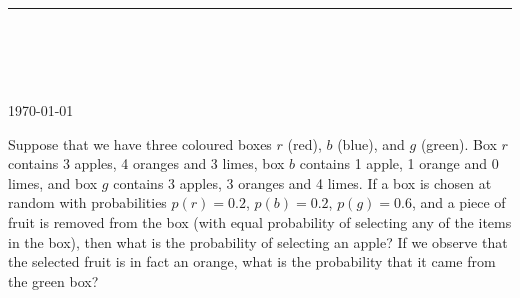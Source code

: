 



\thispagestyle{empty}

\begin{center}
\textsc{\theinstitution}\\[2mm]

\thedepartment

\rule{0.6\textwidth}{0.5pt}\\[2mm]

\thecourse \\[4mm]

{\Large \textbf{\thetitle}}\\[2mm]

\theauthor \\[2mm]

{\small \today}
\end{center}
\medskip

\vspace{1cm}

Suppose that we have three coloured boxes $r$ (red), $b$ (blue), and $g$ (green). Box $r$ contains 3 apples, 4 oranges and 3 limes, box $b$ contains 1 apple, 1 orange and 0 limes, and box $g$ contains 3 apples, 3 oranges and 4 limes. If a box is chosen at random with probabilities $p(r)=0.2$, $p(b)=0.2$, $p(g)=0.6$, and a piece of fruit is removed from the box (with equal probability of selecting any of the items in the box), then what is the probability of selecting an apple? If we observe that the selected fruit is in fact an orange, what is the probability that it came from the green box?

